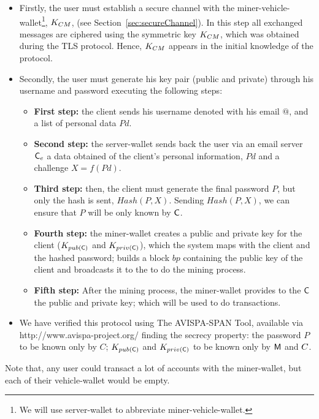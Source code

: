 \begin{itemize}
  \item Firstly, the user must establish a secure channel with the miner-vehicle-wallet\footnote{
        We will use server-wallet to abbreviate miner-vehicle-wallet.},
    $K_{CM}$,
    (see Section~\ref{sec:secureChannel}). In this step all exchanged messages are ciphered 
    using the symmetric key $K_{CM}$, which was obtained during the TLS protocol.
    Hence, $K_{CM}$ appears in the initial knowledge of the protocol.
  \item Secondly, the user must generate his key pair (public and private) through
    his username and password executing the following steps:
    \begin{itemize}
    \item \textbf{First step:} the client sends his username denoted with his email $@$, and  
        a list of personal data $Pd$. 
    \item \textbf{Second step:} the server-wallet sends back the user via an email server $\textsf{C}_e$ a 
        data obtained of the client's personal information, $Pd$ and a challenge $X=f(Pd)$. 
    \item \textbf{Third step:} then, the client must generate the final password $P$, but
      only the hash is sent, $Hash(P,X)$.  Sending $Hash(P,X)$, we can
      ensure that $P$ will be only known by $\textsf{C}$.
    \item \textbf{Fourth step:} the miner-wallet creates a public and private key for the client 
        ($K_{pub(\textsf{C})}$ and $K_{priv(\textsf{C})}$), which the system maps with the client and 
        the hashed password; builds a block $bp$ containing the public key of the client and broadcasts
        it to the \blockchaincarnetwork to do the mining process. 
    \item \textbf{Fifth step:} After the mining process, the miner-wallet provides to the $\textsf{C}$ the 
        public and private key; which will be used to do transactions. 
    \end{itemize}
  \item We have verified this protocol using The AVISPA-SPAN Tool, available via http://www.avispa-project.org/ finding the secrecy property:
        the password $P$ to be known only by $C$; $K_{pub(\textsf{C})}$ and $K_{priv(\textsf{C})}$ to be known only by $\textsf{M}$ and $C$.
\end{itemize}
Note that, any user could transact a lot of accounts with the miner-wallet, but each of their 
vehicle-wallet would be empty.

